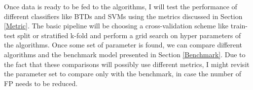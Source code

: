 Once data is ready to be fed to the algorithms, I will test the performance of different classifiers like BTDs and SVMs using the metrics discussed in Section \ref{Metric}. The basic pipeline will be choosing a cross-validation scheme like train-test split or stratified k-fold and perform a grid search on hyper parameters of the algorithms. Once some set of parameter is found, we can compare different algorithms and the benchmark model presented in Section \ref{Benchmark}. Due to the fact that these comparisons will possibly use different metrics, I might revisit the parameter set to compare only with the benchmark, in case the number of FP needs to be reduced.

